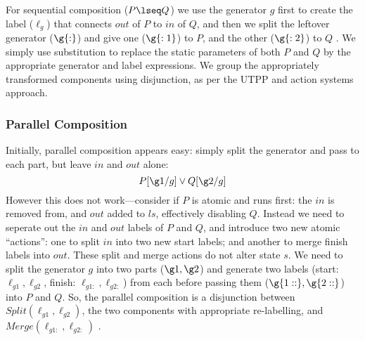 For sequential composition ($P \lseq Q$) we use the generator $g$
first to create the label ($\ell_g$) that connects $out$ of $P$ to $in$ of $Q$,
and then we split the leftover generator ($\g{:}$)
and give one ($\g{:1}$) to $P$, and the other ($\g{:2}$) to $Q$%
.
We simply use substitution to replace the static parameters
of both $P$ and $Q$ by the appropriate generator and label expressions.
We group the appropriately transformed components
using disjunction, as per the UTPP and action systems approach.


\subsubsection{Parallel Composition}



Initially, parallel composition appears easy:
simply split the generator and pass to each part,
but leave $in$ and $out$ alone:
\[
  P[\g1/g] \lor Q[\g2/g]
\]
However this does not work---consider if $P$ is atomic and runs first:
the $in$ is removed from, and $out$ added to $ls$, effectively disabling $Q$.
Instead we need to seperate out the $in$ and $out$ labels of $P$ and $Q$,
and introduce two new atomic ``actions'': one to split $in$  into two new
start labels; and another to merge finish labels into $out$.
These split and merge actions do not alter state $s$.
We need to split the generator $g$ into two parts ($\g1,\g2$)
and generate two labels
(start: $\ell_{g1},\ell_{g2}$,
 finish: $\ell_{g1:},\ell_{g2:}$)
from each before passing them ($\g{1::},\g{2::}$) into $P$ and $Q$.
So, the parallel composition is a disjunction between
$Split(\ell_{g1},\ell_{g2})$,
the two components with appropriate re-labelling,
and $Merge(\ell_{g1:},\ell_{g2:})$%
.

